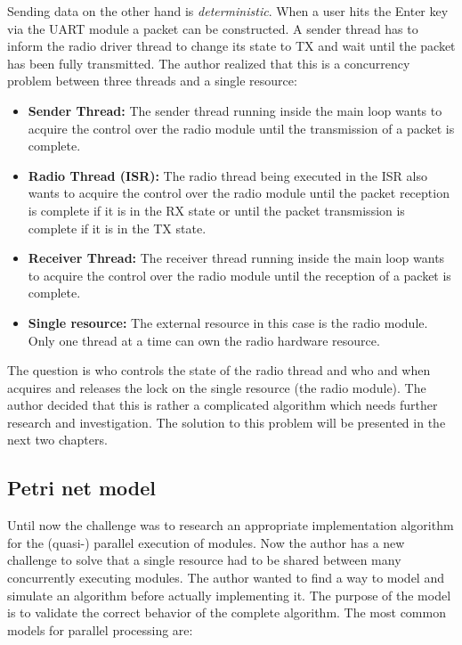 Sending data on the other hand is \emph{deterministic}. When a user hits the Enter key via the UART module a packet can be constructed. A sender thread has to inform the radio driver thread to change its state to TX and wait until the packet has been fully transmitted. The author realized that this is a concurrency problem between three threads and a single resource:

\begin{itemize}
    \item \textbf{Sender Thread:} The sender thread running inside the main loop wants to acquire the control over the radio module until the transmission of a packet is complete.
    \item \textbf{Radio Thread (ISR):} The radio thread being executed in the ISR also wants to acquire the control over the radio module until the packet reception is complete if it is in the RX state or until the packet transmission is complete if it is in the TX state.
    \item \textbf{Receiver Thread:} The receiver thread running inside the main loop wants to acquire the control over the radio module until the reception of a packet is complete.
    \item \textbf{Single resource:} The external resource in this case is the radio module. Only one thread at a time can own the radio hardware resource.
\end{itemize}

The question is who controls the state of the radio thread and who and when acquires and releases the lock on the single resource (the radio module). The author decided that this is rather a complicated algorithm which needs further research and investigation. The solution to this problem will be presented in the next two chapters.

\subsection{Petri net model}%
Until now the challenge was to research an appropriate implementation algorithm for the (quasi-) parallel execution of modules. Now the author has a new challenge to solve that a single resource had to be shared between many concurrently executing modules. The author wanted to find a way to model and simulate an algorithm before actually implementing it. The purpose of the model is to validate the correct behavior of the complete algorithm. The most common models for parallel processing are:

